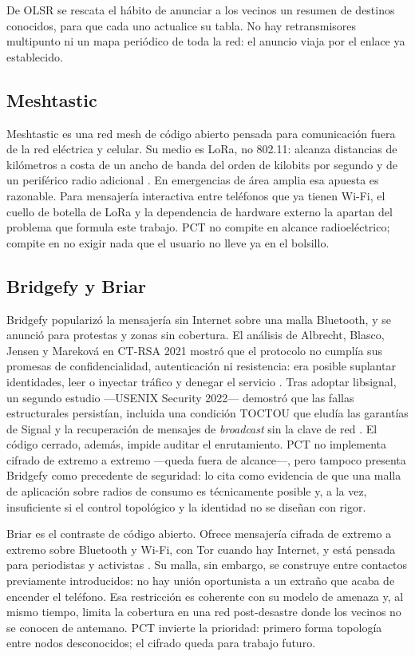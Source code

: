 \documentclass[12pt,oneside]{scrreprt}
\begin{document}
De OLSR se rescata el hábito de anunciar a los vecinos un resumen de destinos conocidos, para que cada uno actualice su tabla. No hay retransmisores multipunto ni un mapa periódico de toda la red: el anuncio viaja por el enlace ya establecido.

\subsection{Meshtastic}

Meshtastic es una red mesh de código abierto pensada para comunicación fuera de la red eléctrica y celular. Su medio es LoRa, no 802.11: alcanza distancias de kilómetros a costa de un ancho de banda del orden de kilobits por segundo y de un periférico radio adicional \parencite{MeshtasticProject2023}. En emergencias de área amplia esa apuesta es razonable. Para mensajería interactiva entre teléfonos que ya tienen Wi-Fi, el cuello de botella de LoRa y la dependencia de hardware externo la apartan del problema que formula este trabajo. PCT no compite en alcance radioeléctrico; compite en no exigir nada que el usuario no lleve ya en el bolsillo.

\subsection{Bridgefy y Briar}

Bridgefy popularizó la mensajería sin Internet sobre una malla Bluetooth, y se anunció para protestas y zonas sin cobertura. El análisis de Albrecht, Blasco, Jensen y Mareková en CT-RSA 2021 mostró que el protocolo no cumplía sus promesas de confidencialidad, autenticación ni resistencia: era posible suplantar identidades, leer o inyectar tráfico y denegar el servicio \parencite{Albrecht2021a}. Tras adoptar libsignal, un segundo estudio ---USENIX Security 2022--- demostró que las fallas estructurales persistían, incluida una condición TOCTOU que eludía las garantías de Signal y la recuperación de mensajes de \emph{broadcast} sin la clave de red \parencite{Albrecht2022}. El código cerrado, además, impide auditar el enrutamiento. PCT no implementa cifrado de extremo a extremo ---queda fuera de alcance---, pero tampoco presenta Bridgefy como precedente de seguridad: lo cita como evidencia de que una malla de aplicación sobre radios de consumo es técnicamente posible y, a la vez, insuficiente si el control topológico y la identidad no se diseñan con rigor.

Briar es el contraste de código abierto. Ofrece mensajería cifrada de extremo a extremo sobre Bluetooth y Wi-Fi, con Tor cuando hay Internet, y está pensada para periodistas y activistas \parencite{BriarProject2021}. Su malla, sin embargo, se construye entre contactos previamente introducidos: no hay unión oportunista a un extraño que acaba de encender el teléfono. Esa restricción es coherente con su modelo de amenaza y, al mismo tiempo, limita la cobertura en una red post-desastre donde los vecinos no se conocen de antemano. PCT invierte la prioridad: primero forma topología entre nodos desconocidos; el cifrado queda para trabajo futuro.
\end{document}
